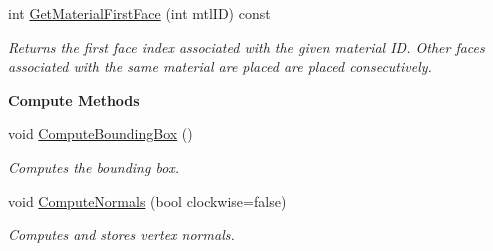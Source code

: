 \begin{Indent}
\begin{DoxyCompactItemize}
\mbox{\label{classcy_1_1_tri_mesh_aff81f71434952539e03bd911bd7ef7ed}} 
int \mbox{\hyperlink{classcy_1_1_tri_mesh_aff81f71434952539e03bd911bd7ef7ed}{Get\+Material\+First\+Face}} (int mtl\+ID) const
\begin{DoxyCompactList}\small\item\em Returns the first face index associated with the given material ID. Other faces associated with the same material are placed are placed consecutively. \end{DoxyCompactList}\end{DoxyCompactItemize}
\end{Indent}
\begin{Indent}\textbf{ Compute Methods}\par
\begin{DoxyCompactItemize}
\item 
\mbox{\label{classcy_1_1_tri_mesh_a9758e3930f987da5db1c1c55821558c9}} 
void \mbox{\hyperlink{classcy_1_1_tri_mesh_a9758e3930f987da5db1c1c55821558c9}{Compute\+Bounding\+Box}} ()
\begin{DoxyCompactList}\small\item\em Computes the bounding box. \end{DoxyCompactList}\item 
\mbox{\label{classcy_1_1_tri_mesh_a6d19efa260ce0838b01036f7607368f5}} 
void \mbox{\hyperlink{classcy_1_1_tri_mesh_a6d19efa260ce0838b01036f7607368f5}{Compute\+Normals}} (bool clockwise=false)
\begin{DoxyCompactList}\small\item\em Computes and stores vertex normals. \end{DoxyCompactList}\end{DoxyCompactItemize}
\end{Indent}
